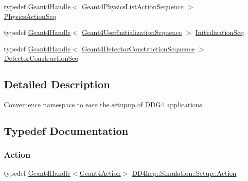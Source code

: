 \begin{DoxyCompactItemize}
\item 
typedef \hyperlink{class_d_d4hep_1_1_simulation_1_1_geant4_handle}{Geant4\+Handle}$<$ \hyperlink{class_d_d4hep_1_1_simulation_1_1_geant4_physics_list_action_sequence}{Geant4\+Physics\+List\+Action\+Sequence} $>$ \hyperlink{namespace_d_d4hep_1_1_simulation_1_1_setup_a4a1525b46f6b47a7c7654bf3b79ea3ce}{Physics\+Action\+Seq}
\item 
typedef \hyperlink{class_d_d4hep_1_1_simulation_1_1_geant4_handle}{Geant4\+Handle}$<$ \hyperlink{class_d_d4hep_1_1_simulation_1_1_geant4_user_initialization_sequence}{Geant4\+User\+Initialization\+Sequence} $>$ \hyperlink{namespace_d_d4hep_1_1_simulation_1_1_setup_a37cbef7433b99bf178ae539e3696477d}{Initialization\+Seq}
\item 
typedef \hyperlink{class_d_d4hep_1_1_simulation_1_1_geant4_handle}{Geant4\+Handle}$<$ \hyperlink{class_d_d4hep_1_1_simulation_1_1_geant4_detector_construction_sequence}{Geant4\+Detector\+Construction\+Sequence} $>$ \hyperlink{namespace_d_d4hep_1_1_simulation_1_1_setup_a66188950ce6f5c228993102224d2552a}{Detector\+Construction\+Seq}
\end{DoxyCompactItemize}


\subsection{Detailed Description}
Convenience namespace to ease the setupup of D\+D\+G4 applications. 

\subsection{Typedef Documentation}
\hypertarget{namespace_d_d4hep_1_1_simulation_1_1_setup_aa958972310161bf099d9d22e59d257ab}{}\label{namespace_d_d4hep_1_1_simulation_1_1_setup_aa958972310161bf099d9d22e59d257ab} 
\subsubsection{\texorpdfstring{Action}{Action}}
{\footnotesize\ttfamily typedef \hyperlink{class_d_d4hep_1_1_simulation_1_1_geant4_handle}{Geant4\+Handle}$<$\hyperlink{class_d_d4hep_1_1_simulation_1_1_geant4_action}{Geant4\+Action}$>$ \hyperlink{namespace_d_d4hep_1_1_simulation_1_1_setup_aa958972310161bf099d9d22e59d257ab}{D\+D4hep\+::\+Simulation\+::\+Setup\+::\+Action}}



